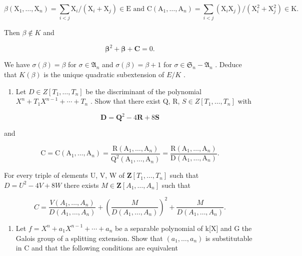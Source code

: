 \[
\beta \left(\mathrm{X} _ {1}, \dots , \mathrm{X} _ {n}\right) = \sum_ {i <   j} \mathrm{X} _ {i} / \left(\mathrm{X} _ {i} + \mathrm{X} _ {j}\right) \in \mathrm{E} \text { and } \mathrm{C} \left(\mathrm{A} _ {1}, \dots , \mathrm{A} _ {n}\right) = \sum_ {i <   j} \left(\mathrm{X} _ {i} \mathrm{X} _ {j}\right) / \left(\mathrm{X} _ {i} ^ {2} + \mathrm{X} _ {j} ^ {2}\right) \in \mathrm{K}.
\]

Then \(\beta \notin K\) and

\[
\boldsymbol {\beta} ^ {2} + \boldsymbol {\beta} + \mathbf {C} = 0.
\]

We have \(\sigma(\beta) = \beta\) for \(\sigma \in \mathfrak{A}_n\) and \(\sigma(\beta) = \beta + 1\) for \(\sigma \in \mathfrak{S}_n - \mathfrak{A}_n\) . Deduce that \(K(\beta)\) is the unique quadratic subextension of \(E/K\) .

\begin{enumerate}
\def\labelenumi{\alph{enumi})}
\setcounter{enumi}{1}
\tightlist
\item
  Let \(D \in Z[T_{1}, \ldots, T_{n}]\) be the discriminant of the polynomial \(X^{n} + T_{1}X^{n-1} + \cdots + T_{n}\) . Show that there exist Q, R, \(S \in Z[T_{1}, \ldots, T_{n}]\) with
\end{enumerate}

\[
\mathbf {D} = \mathbf {Q} ^ {2} - 4 \mathbf {R} + 8 \mathbf {S}
\]

and

\[
\mathrm{C} = \mathrm{C} (\mathrm{A} _ {1}, \dots , \mathrm{A} _ {n}) = \frac {\mathrm{R} (\mathrm{A} _ {1} , \dots , \mathrm{A} _ {n})}{\mathrm{Q} ^ {2} (\mathrm{A} _ {1} , \dots , \mathrm{A} _ {n})} = \frac {\mathrm{R} (\mathrm{A} _ {1} , \dots , \mathrm{A} _ {n})}{\mathrm{D} (\mathrm{A} _ {1} , \dots , \mathrm{A} _ {n})}.
\]

For every triple of elements U, V, W of \(\mathbf{Z}[T_1, \ldots, T_n]\) such that \(D = U^2 - 4V + 8W\) there exists \(M \in \mathbf{Z}[A_1, \ldots, A_n]\) such that

\[
C = \frac {V (A _ {1} , \dots , A _ {n})}{D (A _ {1} , \dots , A _ {n})} + \left(\frac {M}{D (A _ {1} , \dots , A _ {n})}\right) ^ {2} + \frac {M}{D (A _ {1} , \dots , A _ {n})}.
\]

\begin{enumerate}
\def\labelenumi{\alph{enumi})}
\setcounter{enumi}{2}
\tightlist
\item
  Let \(f = X^{n} + a_{1}X^{n-1} + \cdots + a_{n}\) be a separable polynomial of k{[}X{]} and G the Galois group of a splitting extension. Show that \((a_{1}, \ldots, a_{n})\) is substitutable in C and that the following conditions are equivalent
\end{enumerate}

